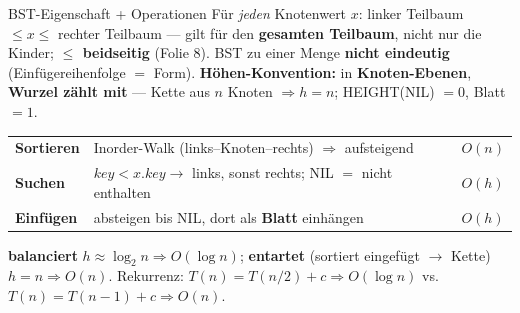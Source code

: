 \documentclass[10pt,a4paper]{article}
\begin{document}
\begin{defbox}{BST-Eigenschaft + Operationen}
\small
Für \emph{jeden} Knotenwert $x$: linker Teilbaum $\le x \le$ rechter Teilbaum — gilt für den
\textbf{gesamten Teilbaum}, nicht nur die Kinder; \textbf{$\le$ beidseitig} (Folie 8). BST zu
einer Menge \textbf{nicht eindeutig} (Einfügereihenfolge $=$ Form).
\textbf{Höhen-Konvention:} in \textbf{Knoten-Ebenen}, \textbf{Wurzel zählt mit} — Kette aus $n$
Knoten $\Rightarrow h = n$; HEIGHT(NIL) $= 0$, Blatt $= 1$.
\par\vspace{2pt}
\renewcommand{\arraystretch}{1.15}
\begin{tabular}{@{}lll@{}}
\textbf{Sortieren} & Inorder-Walk (links–Knoten–rechts) $\Rightarrow$ aufsteigend & $O(n)$ \\
\textbf{Suchen} & $key < x.key \to$ links, sonst rechts; NIL $=$ nicht enthalten & $O(h)$ \\
\textbf{Einfügen} & absteigen bis NIL, dort als \textbf{Blatt} einhängen & $O(h)$ \\
\end{tabular}
\par\vspace{1pt}
\textbf{balanciert} $h \approx \log_2 n \Rightarrow O(\log n)$; \textbf{entartet} (sortiert
eingefügt $\to$ Kette) $h = n \Rightarrow O(n)$. Rekurrenz: $T(n){=}T(n/2){+}c \Rightarrow
O(\log n)$ vs.\ $T(n){=}T(n{-}1){+}c \Rightarrow O(n)$.
\end{defbox}
\end{document}
